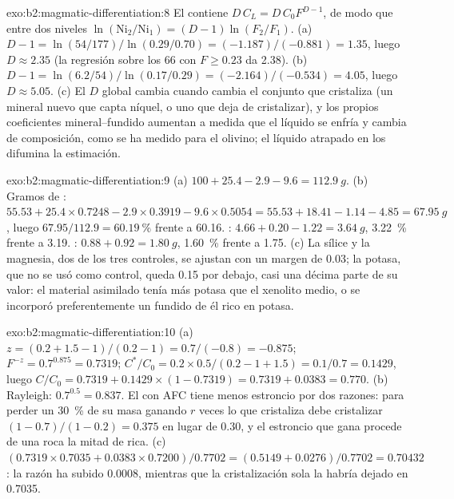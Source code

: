 \begin{solution}{exo:b2:magmatic-differentiation:8}
El  contiene $D\,C_L = D\,C_0F^{D-1}$, de modo que entre dos niveles
$\ln(\mathrm{Ni}_2/\mathrm{Ni}_1) = (D - 1)\ln(F_2/F_1)$. (a) $D - 1 = \ln(54/177)/
\ln(0.29/0.70) = (-1.187)/(-0.881) = 1.35$, luego $D \approx 2.35$ (la regresión sobre
los 66  con $F \ge 0.23$ da 2.38). (b) $D - 1 = \ln(6.2/54)/\ln(0.17/0.29) = (-2.164)/(-0.534)
= 4.05$, luego $D \approx 5.05$. (c) El $D$ global cambia cuando cambia el conjunto
que cristaliza (un mineral nuevo que capta níquel, o uno que deja de cristalizar), y
los propios coeficientes mineral--fundido aumentan a medida que el líquido se enfría y cambia de
composición, como se ha medido para el olivino; el líquido atrapado en los  difumina la
estimación.
\end{solution}

\begin{solution}{exo:b2:magmatic-differentiation:9}
(a) $100 + 25.4 - 2.9 - 9.6 = \qty{112.9}{g}$. (b) Gramos de : $55.53 +
25.4\times0.7248 - 2.9\times0.3919 - 9.6\times0.5054 = 55.53 + 18.41 - 1.14 - 4.85 =
\qty{67.95}{g}$, luego $67.95/112.9 = \qty{60.19}{\percent}$ frente a 60.16. :
$4.66 + 0.20 - 1.22 = \qty{3.64}{g}$, \qty{3.22}{\percent} frente a 3.19. :
$0.88 + 0.92 = \qty{1.80}{g}$, \qty{1.60}{\percent} frente a 1.75. (c) La sílice y la magnesia, dos de los tres
controles, se ajustan con un margen de 0.03; la potasa, que no se usó como control, queda 0.15 por debajo, casi una
décima parte de su valor: el material asimilado tenía más potasa que el xenolito
medio, o se incorporó preferentemente un fundido de él rico en potasa.
\end{solution}

\begin{solution}{exo:b2:magmatic-differentiation:10}
(a) $z = (0.2 + 1.5 - 1)/(0.2 - 1) = 0.7/(-0.8) = -0.875$; $F^{-z} = 0.7^{0.875} =
0.7319$; $C^*/C_0 = 0.2\times0.5/(0.2 - 1 + 1.5) = 0.1/0.7 = 0.1429$, luego $C/C_0 =
0.7319 + 0.1429\times(1 - 0.7319) = 0.7319 + 0.0383 = 0.770$. (b) Rayleigh:
$0.7^{0.5} = 0.837$. El  con AFC tiene menos estroncio por dos razones: para perder
un \qty{30}{\percent} de su masa ganando $r$ veces lo que cristaliza debe
cristalizar $(1 - 0.7)/(1 - 0.2) = 0.375$ en lugar de 0.30, y el estroncio que gana
procede de una roca la mitad de rica. (c) $(0.7319\times0.7035 + 0.0383\times0.7200)/0.7702
= (0.5149 + 0.0276)/0.7702 = 0.70432$: la razón ha subido 0.0008, mientras que la
cristalización sola la habría dejado en 0.7035.
\end{solution}

